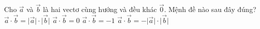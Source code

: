 
\begin{ex}%
	Cho $\overrightarrow{a} $ và $\overrightarrow{b} $ là hai vectơ cùng hướng và đều khác $\overrightarrow{0} $. Mệnh đề nào sau đây đúng?
	\choice
	{\True $\overrightarrow{a} \cdot \overrightarrow{b}=\big| \overrightarrow{a}\big| \cdot \big| \overrightarrow{b}\big| $}
	{$\overrightarrow{a} \cdot \overrightarrow{b}=0$}
	{$\overrightarrow{a} \cdot \overrightarrow{b}=-1$}
	{$\overrightarrow{a} \cdot \overrightarrow{b}=-\big| \overrightarrow{a}\big| \cdot \big| \overrightarrow{b}\big| $}
\end{ex}


